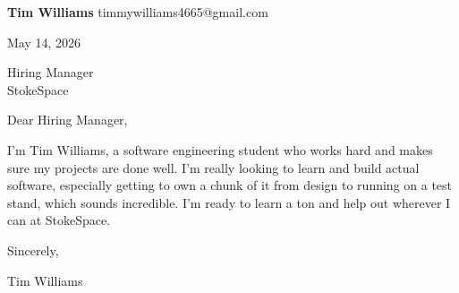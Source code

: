 \documentclass[12pt]{article}
\begin{document}
\textbf{Tim Williams} \hfill timmywilliams4665@gmail.com

\vspace{1em}

May 14, 2026

\vspace{1em}

Hiring Manager \\
StokeSpace

\vspace{1em}

Dear Hiring Manager,

I'm Tim Williams, a software engineering student who works hard and makes sure my projects are done well. I'm really looking to learn and build actual software, especially getting to own a chunk of it from design to running on a test stand, which sounds incredible. I'm ready to learn a ton and help out wherever I can at StokeSpace.

\vspace{1em}

Sincerely,

\vspace{2em}

Tim Williams
\end{document}
